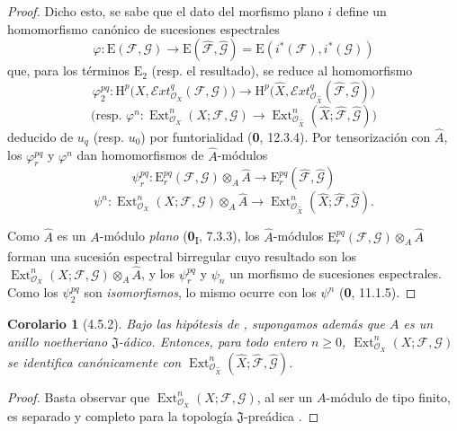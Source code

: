 \documentclass[10pt,oneside,openany]{book}
\theoremstyle{egaenv}\newtheorem*{env}{---}
\theoremstyle{egastatement}
\newtheorem*{corollary}{Corolario}
\theoremstyle{egadescription}
\renewcommand{\geq}{\geqslant}
\begin{document}
\begin{proof}
Dicho esto, se sabe que el dato del morfismo plano $i$ define un
homomorfismo canónico de sucesiones espectrales
\[
\varphi:\mathrm E(\mathcal F,\mathcal G)\longrightarrow
\mathrm E(\widehat{\mathcal F},\widehat{\mathcal G})
=\mathrm E(i^*(\mathcal F),i^*(\mathcal G))
\]
que, para los términos $\mathrm E_2$ (resp. el resultado), se reduce al
homomorfismo
\[
\varphi_2^{pq}:\mathrm H^p\bigl(X,
\mathcal{E}\!xt^q_{\mathcal O_X}(\mathcal F,\mathcal G)\bigr)
\longrightarrow
\mathrm H^p\bigl(\widehat X,
\mathcal{E}\!xt^q_{\mathcal O_{\widehat X}}
(\widehat{\mathcal F},\widehat{\mathcal G})\bigr)
\]
\[
\text{(resp. }\varphi^n:\operatorname{Ext}^n_{\mathcal O_X}
(X;\mathcal F,\mathcal G)\longrightarrow
\operatorname{Ext}^n_{\mathcal O_{\widehat X}}
(\widehat X;\widehat{\mathcal F},\widehat{\mathcal G})\text{)}
\]
deducido de $u_q$ (resp. $u_0$) por funtorialidad (\textbf{0}, 12.3.4). Por
tensorización con $\widehat A$, los $\varphi_r^{pq}$ y $\varphi^n$ dan
homomorfismos de $\widehat A$-módulos
\[
\psi_r^{pq}:\mathrm E_r^{pq}(\mathcal F,\mathcal G)
\otimes_A\widehat A\longrightarrow
\mathrm E_r^{pq}(\widehat{\mathcal F},\widehat{\mathcal G})
\]
\[
\psi^n:\operatorname{Ext}^n_{\mathcal O_X}(X;\mathcal F,\mathcal G)
\otimes_A\widehat A\longrightarrow
\operatorname{Ext}^n_{\mathcal O_{\widehat X}}
(\widehat X;\widehat{\mathcal F},\widehat{\mathcal G}).
\]

Como $\widehat A$ es un $A$-módulo \emph{plano} (\textbf{0}\textsubscript{I}, 7.3.3), los
$\widehat A$-módulos
$\mathrm E_r^{pq}(\mathcal F,\mathcal G)\otimes_A\widehat A$ forman una
sucesión espectral birregular cuyo resultado son los
$\operatorname{Ext}^n_{\mathcal O_X}(X;\mathcal F,\mathcal G)\otimes_A\widehat A$, y los
$\psi_r^{pq}$ y $\psi_n$ un morfismo de sucesiones espectrales. Como los
$\psi_2^{pq}$ son \emph{isomorfismos}, lo mismo ocurre con los $\psi^n$
(\textbf{0}, 11.1.5).
\end{proof}

\begin{corollary}[4.5.2]
\label{III.4.5.2}
\label{III.4.5.2-fr}
Bajo las hipótesis de , supongamos además que $A$ es
un anillo noetheriano $\mathfrak J$-ádico. Entonces, para todo entero
$n\geq0$, $\operatorname{Ext}^n_{\mathcal O_X}(X;\mathcal F,\mathcal G)$
se identifica canónicamente con
$\operatorname{Ext}^n_{\mathcal O_{\widehat X}}
(\widehat X;\widehat{\mathcal F},\widehat{\mathcal G})$.
\end{corollary}

\begin{proof}
Basta observar que $\operatorname{Ext}^n_{\mathcal O_X}
(X;\mathcal F,\mathcal G)$, al ser un $A$-módulo de tipo finito, es separado y
completo para la topología $\mathfrak J$-preádica .
\end{proof}
\end{document}
